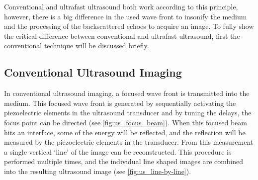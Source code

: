 Conventional and ultrafast ultrasound both work according to this principle, however, there is a big difference in the used wave front to insonify the medium and the processing of the backscattered echoes to acquire an image. To fully show the critical difference between conventional and ultrafast ultrasound, first the conventional technique will be discussed briefly. 



\subsection{Conventional Ultrasound Imaging}
In conventional ultrasound imaging, a focused wave front is transmitted into the medium. This focused wave front is generated by sequentially activating the piezoelectric elements in the ultrasound transducer and by tuning the delays, the focus point can be directed (see \autoref{fig:us_focus_beam}). When this focused beam hits an interface, some of the energy will be reflected, and the reflection will be measured by the piezoelectric elements in the transducer. From this measurement a single vertical `line' of the image can be reconstructed. This procedure is performed multiple times, and the individual line shaped images are combined into the resulting ultrasound image (see \autoref{fig:us_line-by-line}). 


